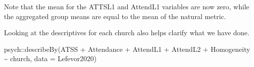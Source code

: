 \documentclass[
  english,
]{book}
\newenvironment{Shaded}{\begin{snugshade}}{\end{snugshade}}
\newcommand{\AttributeTok}[1]{\textcolor[rgb]{0.77,0.63,0.00}{#1}}
\newcommand{\FunctionTok}[1]{\textcolor[rgb]{0.00,0.00,0.00}{#1}}
\newcommand{\NormalTok}[1]{#1}
\newcommand{\SpecialCharTok}[1]{\textcolor[rgb]{0.00,0.00,0.00}{#1}}
\begin{document}
Note that the mean for the ATTSL1 and AttendL1 variables are now zero, while the aggregated group means are equal to the mean of the natural metric.

Looking at the descriptives for each church also helps clarify what we have done.

\begin{Shaded}
\begin{Highlighting}[]
\NormalTok{psych}\SpecialCharTok{::}\FunctionTok{describeBy}\NormalTok{(ATSS }\SpecialCharTok{+}\NormalTok{ Attendance }\SpecialCharTok{+}\NormalTok{ AttendL1 }\SpecialCharTok{+}\NormalTok{ AttendL2 }\SpecialCharTok{+}\NormalTok{ Homogeneity }\SpecialCharTok{\textasciitilde{}}\NormalTok{ church, }\AttributeTok{data =}\NormalTok{ Lefevor2020)}
\end{Highlighting}
\end{Shaded}
\end{document}
